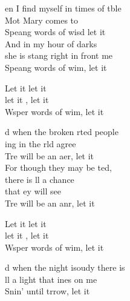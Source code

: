 \begin{cancion}%
	en I find myself in times of tble\\
	Mot Mary comes to \\
	Speang words of wisd let it  \\
	And in my hour of darks\\
	she is stang right in front  me\\
	Speang words of wim, let it  \jump\\
	\begin{chorus}%
		Let it  let it \\
		let it , let it \\
		Wsper words of wim, let it \jump\\
	\end{chorus}%
	\jump
	d when the broken rted people\\
	ing in the rld agree\\
	Tre will be an aer, let it  \\
	For though they may be ted, \\
	there is ll a chance \\
	that ey will see\\
	Tre will be an anr, let it  \jump\\
	\begin{chorus}%
		Let it  let it \chord{Sol}{}{be,}\\
		let it , let it \chord{Do}{}{be}\\
		Wsper words of wim, let it \jump\\
	\end{chorus}%
	d when the night isoudy there is\\
	ll a light that ines on me\\
	Snin' until trrow, let it  \\

\end{cancion}
